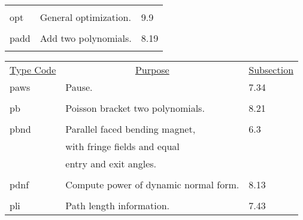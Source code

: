 \begin{center}
\begin{tabular}{lll}
\vspace{-3mm}& &\\
\hspace{1.5em}opt    &   General optimization.        &    \hspace{2em}9.9\\
\vspace{-3mm}& &\\
\hspace{1.5em}padd    &      Add two polynomials.       &   \hspace{2em}8.19\\
\vspace{-3mm}& &\\
\end{tabular}

\newpage
\begin{tabular}{lll}
\multicolumn{1}{c}{\underline {Type Code}} &
\multicolumn{1}{c}{\underline{Purpose}}   &
\multicolumn{1}{c}{\underline{Subsection}} \\
\hspace{1.5em}paws  &         Pause.        & \hspace{2em}7.34\\
\vspace{-3mm}& &\\
\hspace{1.5em}pb      &   Poisson bracket two polynomials. &  \hspace{2em}8.21\\
\vspace{-3mm}& &\\
\hspace{1.5em}pbnd    &   Parallel faced bending magnet,  &  \hspace{2em}6.3 \\
               &             with fringe fields and equal    &      \\
               &             entry and exit angles.          &      \\
\vspace{-3mm}& &\\
\hspace{1.5em}pdnf   & Compute power of dynamic normal form.&  \hspace{2em}8.13\\
\vspace{-3mm}& &\\
\hspace{1.5em}pli   & Path length information.&  \hspace{2em}7.43\\

\end{tabular}
\end{center}
